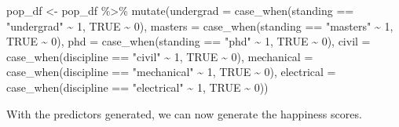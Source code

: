 \documentclass[
]{book}
\newenvironment{Shaded}{\begin{snugshade}}{\end{snugshade}}
\newcommand{\AttributeTok}[1]{\textcolor[rgb]{0.77,0.63,0.00}{#1}}
\newcommand{\ConstantTok}[1]{\textcolor[rgb]{0.00,0.00,0.00}{#1}}
\newcommand{\DecValTok}[1]{\textcolor[rgb]{0.00,0.00,0.81}{#1}}
\newcommand{\FunctionTok}[1]{\textcolor[rgb]{0.00,0.00,0.00}{#1}}
\newcommand{\NormalTok}[1]{#1}
\newcommand{\OtherTok}[1]{\textcolor[rgb]{0.56,0.35,0.01}{#1}}
\newcommand{\SpecialCharTok}[1]{\textcolor[rgb]{0.00,0.00,0.00}{#1}}
\newcommand{\StringTok}[1]{\textcolor[rgb]{0.31,0.60,0.02}{#1}}
\begin{document}
\begin{Shaded}
\begin{Highlighting}[]
\NormalTok{pop\_df }\OtherTok{\textless{}{-}}\NormalTok{ pop\_df }\SpecialCharTok{\%\textgreater{}\%} 
  \FunctionTok{mutate}\NormalTok{(}\AttributeTok{undergrad =} \FunctionTok{case\_when}\NormalTok{(standing }\SpecialCharTok{==} \StringTok{"undergrad"} \SpecialCharTok{\textasciitilde{}} \DecValTok{1}\NormalTok{,}
                           \ConstantTok{TRUE} \SpecialCharTok{\textasciitilde{}} \DecValTok{0}\NormalTok{),}
         \AttributeTok{masters =} \FunctionTok{case\_when}\NormalTok{(standing }\SpecialCharTok{==} \StringTok{"masters"} \SpecialCharTok{\textasciitilde{}} \DecValTok{1}\NormalTok{,}
                           \ConstantTok{TRUE} \SpecialCharTok{\textasciitilde{}} \DecValTok{0}\NormalTok{),}
         \AttributeTok{phd =} \FunctionTok{case\_when}\NormalTok{(standing }\SpecialCharTok{==} \StringTok{"phd"} \SpecialCharTok{\textasciitilde{}} \DecValTok{1}\NormalTok{,}
                           \ConstantTok{TRUE} \SpecialCharTok{\textasciitilde{}} \DecValTok{0}\NormalTok{),}
         \AttributeTok{civil =} \FunctionTok{case\_when}\NormalTok{(discipline }\SpecialCharTok{==} \StringTok{"civil"} \SpecialCharTok{\textasciitilde{}} \DecValTok{1}\NormalTok{,}
                           \ConstantTok{TRUE} \SpecialCharTok{\textasciitilde{}} \DecValTok{0}\NormalTok{),}
         \AttributeTok{mechanical =} \FunctionTok{case\_when}\NormalTok{(discipline }\SpecialCharTok{==} \StringTok{"mechanical"} \SpecialCharTok{\textasciitilde{}} \DecValTok{1}\NormalTok{,}
                           \ConstantTok{TRUE} \SpecialCharTok{\textasciitilde{}} \DecValTok{0}\NormalTok{),}
         \AttributeTok{electrical =} \FunctionTok{case\_when}\NormalTok{(discipline }\SpecialCharTok{==} \StringTok{"electrical"} \SpecialCharTok{\textasciitilde{}} \DecValTok{1}\NormalTok{,}
                           \ConstantTok{TRUE} \SpecialCharTok{\textasciitilde{}} \DecValTok{0}\NormalTok{))}
\end{Highlighting}
\end{Shaded}

With the predictors generated, we can now generate the happiness scores.
\end{document}
